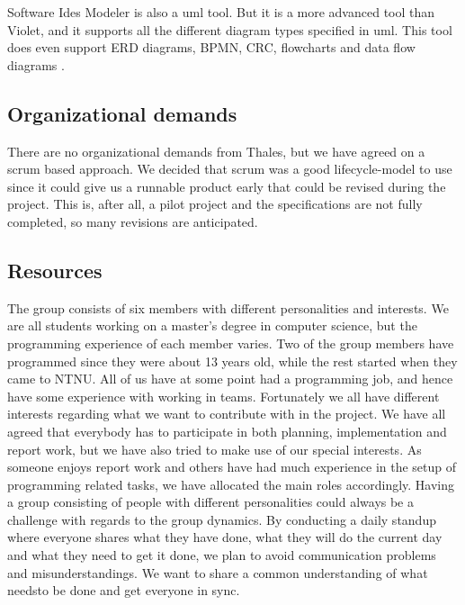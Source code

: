 Software Ides Modeler is also a \gls{uml} tool. But it is a more advanced tool than Violet, and it supports all the different diagram types specified in \gls{uml}. This tool does even support ERD diagrams, BPMN, CRC, flowcharts and data flow diagrams \cite{bib:sim}.

\pagebreak

\subsection{Organizational demands}
There are no organizational demands from Thales, but we have agreed on a scrum based approach. We decided that scrum was a good lifecycle-model to use since it could give us a runnable product early that could be revised during the project. This is, after all, a pilot project and the specifications are not fully completed, so many revisions are anticipated.

\subsection{Resources}
The group consists of six members with different personalities and interests. We are all students working on a master's degree in computer science, but the programming experience of each member varies. Two of the group members have programmed since they were about 13 years old, while the rest started when they came to NTNU. All of us have at some point had a programming job, and hence have some experience with working in teams.
\newline
\newline
Fortunately we all have different interests regarding what we want to contribute with in the project. We have all agreed that everybody has to participate in both planning, implementation and report work, but we have also tried to make use of our special interests. As someone enjoys report work and others have had much experience in the setup of programming related tasks, we have allocated the main roles accordingly.
\newline
\newline
Having a group consisting of people with different personalities could always be a challenge with regards to the group dynamics. By conducting a daily standup where everyone shares what they have done, what they will do the current day and what they need to get it done, we plan to avoid communication problems and misunderstandings. We want to share a common understanding of what needsto be done and get everyone in sync. 

